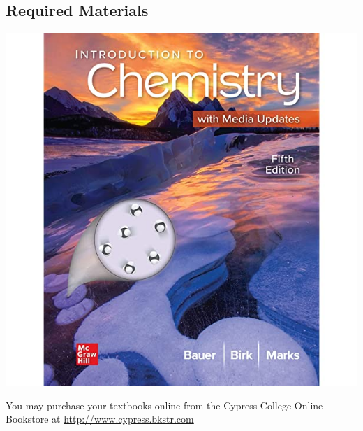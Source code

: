 \documentclass[11pt]{article}
\begin{document}
\subsection{Required Materials}

\begin{center}
  \includegraphics[scale=0.3]{bauer_text}
\end{center}

You may purchase your textbooks online from the Cypress College Online Bookstore
at \url{http://www.cypress.bkstr.com}
\end{document}
